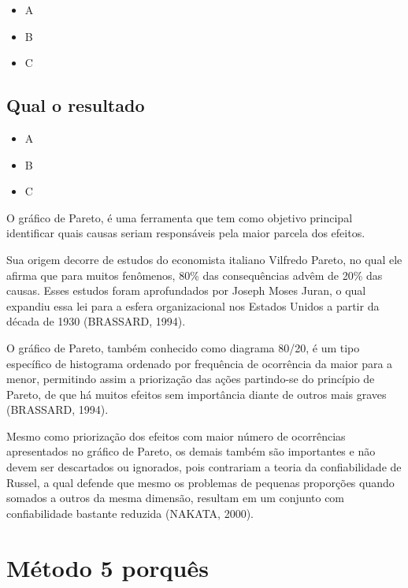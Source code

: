 \documentclass[
]{article}
\providecommand{\tightlist}{%
  \setlength{\itemsep}{0pt}\setlength{\parskip}{0pt}}
\begin{document}
\begin{itemize}
\tightlist
\item
  A
\item
  B
\item
  C
\end{itemize}

\hypertarget{qual-o-resultado-4}{%
\subsection*{Qual o resultado}\label{qual-o-resultado-4}}

\begin{itemize}
\tightlist
\item
  A
\item
  B
\item
  C
\end{itemize}

O gráfico de Pareto, é uma ferramenta que tem como objetivo principal identificar quais causas seriam responsáveis pela maior parcela dos efeitos.

Sua origem decorre de estudos do economista italiano Vilfredo Pareto, no qual ele afirma que para muitos fenômenos, 80\% das consequências advêm de 20\% das causas. Esses estudos foram aprofundados por Joseph Moses Juran, o qual expandiu essa lei para a esfera organizacional nos Estados Unidos a partir da década de 1930 (BRASSARD, 1994).

O gráfico de Pareto, também conhecido como diagrama 80/20, é um tipo específico de histograma ordenado por frequência de ocorrência da maior para a menor, permitindo assim a priorização das ações partindo-se do princípio de Pareto, de que há muitos efeitos sem importância diante de outros mais graves (BRASSARD, 1994).

Mesmo como priorização dos efeitos com maior número de ocorrências apresentados no gráfico de Pareto, os demais também são importantes e não devem ser descartados ou ignorados, pois contrariam a teoria da confiabilidade de Russel, a qual defende que mesmo os problemas de pequenas proporções quando somados a outros da mesma dimensão, resultam em um conjunto com confiabilidade bastante reduzida (NAKATA, 2000).

\hypertarget{muxe9todo-5-porquuxeas}{%
\section{Método 5 porquês}\label{muxe9todo-5-porquuxeas}}
\end{document}
